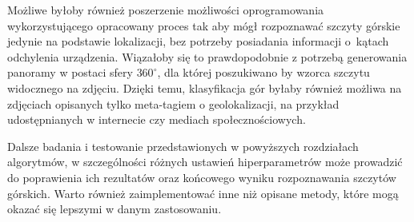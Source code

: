 Możliwe byłoby również poszerzenie możliwości oprogramowania wykorzystującego opracowany proces tak aby mógł rozpoznawać szczyty górskie jedynie na podstawie lokalizacji, bez potrzeby posiadania informacji o~kątach odchylenia urządzenia. Wiązałoby się to prawdopodobnie z potrzebą generowania panoramy w postaci sfery $360^{\circ}$, dla której poszukiwano by wzorca szczytu widocznego na zdjęciu. Dzięki temu, klasyfikacja gór byłaby również możliwa na zdjęciach opisanych tylko meta-tagiem o geolokalizacji, na przykład udostępnianych w internecie czy mediach społecznościowych.

Dalsze badania i testowanie przedstawionych w powyższych rozdziałach algorytmów, w szczególności różnych ustawień hiperparametrów może prowadzić do poprawienia ich rezultatów oraz końcowego wyniku rozpoznawania szczytów górskich. Warto również zaimplementować inne niż opisane metody, które mogą okazać się lepszymi w danym zastosowaniu. 
